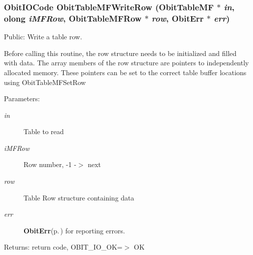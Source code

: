 \subsubsection{\setlength{\rightskip}{0pt plus 5cm}Obit\-IOCode Obit\-Table\-MFWrite\-Row ({\bf Obit\-Table\-MF} $\ast$ {\em in}, {\bf olong} {\em i\-MFRow}, {\bf Obit\-Table\-MFRow} $\ast$ {\em row}, {\bf Obit\-Err} $\ast$ {\em err})}\label{ObitTableMF_8c_a24}


Public: Write a table row. 

Before calling this routine, the row structure needs to be initialized and filled with data. The array members of the row structure are pointers to independently allocated memory. These pointers can be set to the correct table buffer locations using Obit\-Table\-MFSet\-Row \begin{Desc}
\item[Parameters:]
\begin{description}
\item[{\em in}]Table to read \item[{\em i\-MFRow}]Row number, -1 -$>$ next \item[{\em row}]Table Row structure containing data \item[{\em err}]{\bf Obit\-Err}{\rm (p.\,\pageref{structObitErr})} for reporting errors. \end{description}
\end{Desc}
\begin{Desc}
\item[Returns:]return code, OBIT\_\-IO\_\-OK=$>$ OK \end{Desc}
